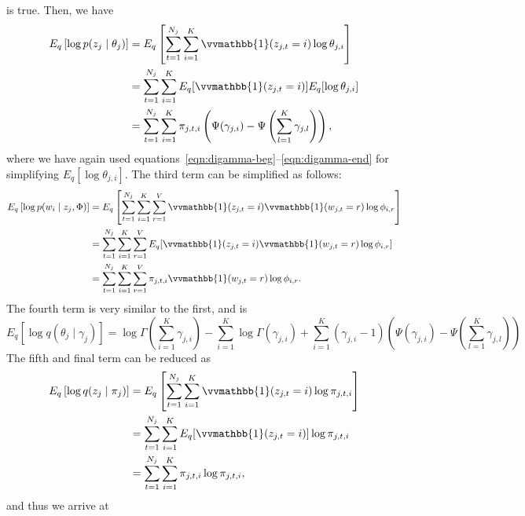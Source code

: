 \documentclass[11pt]{article}
\newcommand{\indicator}{\vvmathbb{1}}
\begin{document}
is true. Then, we have
\begin{align}
  E_q\left[\log p(z_j \mid \theta_j)\right]
  &=
  E_q\left[\sum_{t=1}^{N_j} \sum_{i=1}^K \indicator(z_{j,t} = i)\log
  \theta_{j,i}\right]
  \\&=
  \sum_{t=1}^{N_j} \sum_{i=1}^K E_q[\indicator(z_{j,t} = i)]E_q[\log
  \theta_{j,i}]
  \\&=
  \sum_{t=1}^{N_j} \sum_{i=1}^K \pi_{j,t,i}
  \left(\Psi(\gamma_{j,i}) - \Psi\left(\sum_{l=1}^K \gamma_{j,l}\right)\right),
\end{align}
where we have again used
equations~\ref{eqn:digamma-beg}--\ref{eqn:digamma-end} for simplifying
$E_q[\log \theta_{j,i}]$. The third term can be simplified as follows:
\begin{align}
  E_q\left[\log p(w_i \mid z_j, \Phi)\right]
  &=
  E_q\left[
    \sum_{t=1}^{N_j} \sum_{i=1}^K \sum_{r=1}^V
    \indicator(z_{j,t} = i)\indicator(w_{j,t} = r)\log \phi_{i,r}
  \right]
  \\&=
  \sum_{t=1}^{N_j} \sum_{i=1}^K \sum_{r=1}^V
  E_q[\indicator(z_{j,t} = i)
  \indicator(w_{j,t} = r)
  \log \phi_{i,r}]
  \\&=
  \sum_{t=1}^{N_j} \sum_{i=1}^K \sum_{r=1}^V
  \pi_{j,t,i} \indicator(w_{j,t} = r) \log \phi_{i,r}.
\end{align}
The fourth term is very similar to the first, and is
\begin{equation}
  E_q\left[\log q(\theta_j \mid \gamma_j) \right]
  =
  \log \Gamma\left(\sum_{i=1}^K \gamma_{j,i}\right)
  - \sum_{i=1}^K \log \Gamma(\gamma_{j,i})
  + \sum_{i=1}^K (\gamma_{j,i} - 1)
  \left(\Psi(\gamma_{j,i}) - \Psi\left(\sum_{l=1}^K \gamma_{j,l}\right)\right)
\end{equation}
The fifth and final term can be reduced as
\begin{align}
  E_q\left[\log q(z_j \mid \pi_j)\right]
  &=
  E_q\left[
    \sum_{t=1}^{N_j} \sum_{i=1}^K
    \indicator(z_{j,t} = i) \log \pi_{j,t,i}
  \right]
  \\&=
  \sum_{t=1}^{N_j} \sum_{i=1}^K
  E_q[\indicator(z_{j,t} = i)] \log \pi_{j,t,i}
  \\&=
  \sum_{t=1}^{N_j} \sum_{i=1}^K
  \pi_{j,t,i} \log \pi_{j,t,i},
\end{align}
and thus we arrive at
\end{document}
